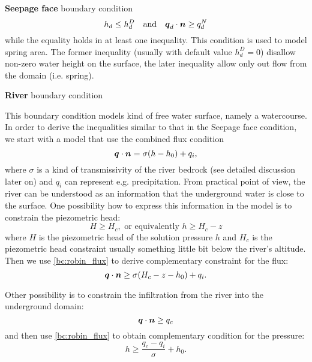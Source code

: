 
{\bf Seepage face} boundary condition 
\[
    h_d \le h_d^D\quad \text{and} \quad \mathbf{\boldsymbol{q}}_d \cdot \mathbf{\boldsymbol{n}} \ge q_d^N
\]    
while the equality holds in at least one inequality. This condition is used to model spring area. 
The former inequality
(usually with default value $h_d^D=0$) disallow non-zero water height on the surface, the later
inequality allow only out flow from the domain (i.e. spring).

{\bf River} boundary condition

This boundary condition models kind of free water surface, namely a watercourse.
In order to derive the inequalities similar to that in the Seepage face condition, we
start with a model that use the combined flux condition
\begin{equation}
    \label{bc:robin_flux}
    \vc q \cdot \vc n = \sigma (h - h_0) + q_i,
\end{equation}
where $\sigma$ is a kind of transmissivity of the river bedrock (see detailed discussion later on) and $q_i$ can represent e.g. precipitation.
From practical point of view, the river can be understood as an information that the underground water
is close to the surface. One possibility how to express this information in the model is to constrain the piezometric head:
\[
    H \ge H_c, \text{ or equivalently } h \ge H_c - z
\]
where $H$ is the piezometric head of the solution pressure $h$ and $H_c$ is the piezometric head constraint usually something little bit below
the river's altitude. Then we use \eqref{bc:robin_flux} to derive complementary constraint for the flux:
\[
    \mathbf{\boldsymbol{q}} \cdot \mathbf{\boldsymbol{n}} \ge \sigma(H_c - z - h_0) + q_i.
\]


Other possibility is to constrain the infiltration from the river into the underground domain:
\[
    \mathbf{\boldsymbol{q}} \cdot \mathbf{\boldsymbol{n}} \ge q_c
\]
and then use \eqref{bc:robin_flux} to obtain complementary condition for the pressure:
\[
    h \ge \frac{q_c - q_i}{\sigma} + h_0.
\]



